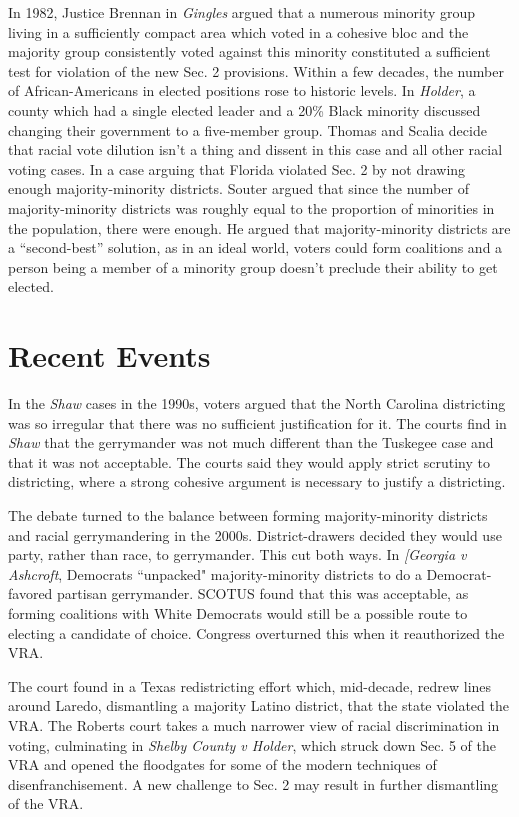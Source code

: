 In 1982, Justice Brennan in \textit{Gingles} argued that a numerous minority group living in a sufficiently compact area which voted in a cohesive bloc and the majority group consistently voted against this minority constituted a sufficient test for violation of the new Sec. 2 provisions.  Within a few decades, the number of African-Americans in elected positions rose to historic levels.  In \textit{Holder}, a county which had a single elected leader and a 20\% Black minority discussed changing their government to a five-member group.  Thomas and Scalia decide that racial vote dilution isn't a thing and dissent in this case and all other racial voting cases.  In a case arguing that Florida violated Sec. 2 by not drawing enough majority-minority districts.  Souter argued that since the number of majority-minority districts was roughly equal to the proportion of minorities in the population, there were enough. He argued that majority-minority districts are a ``second-best'' solution, as in an ideal world, voters could form coalitions and a person being a member of a minority group doesn't preclude their ability to get elected.

\section*{Recent Events}

In the \textit{Shaw} cases in the 1990s, voters argued that the North Carolina districting was so irregular that there was no sufficient justification for it.  The courts find in \textit{Shaw} that the gerrymander was not much different than the Tuskegee case and that it was not acceptable.  The courts said they would apply strict scrutiny to districting, where a strong cohesive argument is necessary to justify a districting.  

The debate turned to the balance between forming majority-minority districts and racial gerrymandering in the 2000s.  District-drawers decided they would use party, rather than race, to gerrymander.  This cut both ways.  In \textit{[Georgia v Ashcroft}, Democrats ``unpacked" majority-minority districts to do a Democrat-favored partisan gerrymander.  SCOTUS found that this was acceptable, as forming coalitions with White Democrats would still be a possible route to electing a candidate of choice.  Congress overturned this when it reauthorized the VRA.

The court found in a Texas redistricting effort which, mid-decade, redrew lines around Laredo, dismantling a majority Latino district, that the state violated the VRA.  The Roberts court takes a much narrower view of racial discrimination in voting, culminating in \textit{Shelby County v Holder}, which struck down Sec. 5 of the VRA and opened the floodgates for some of the modern techniques of disenfranchisement. A new challenge to Sec. 2 may result in further dismantling of the VRA.
